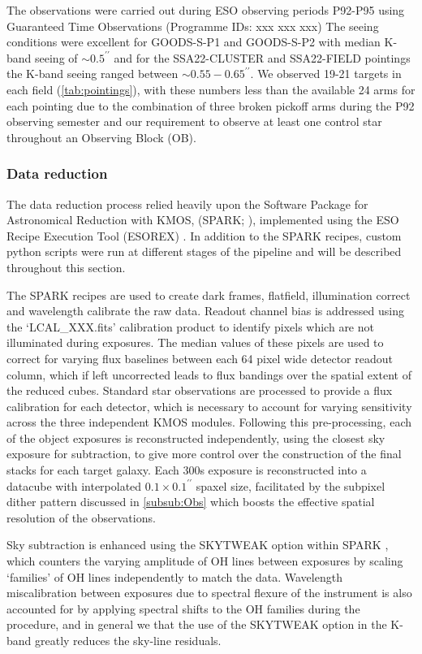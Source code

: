 \documentclass[fleqn,usenatbib]{mn2e}
\begin{document}
The observations were carried out during ESO observing periods P92-P95 using Guaranteed Time Observations (Programme IDs: xxx xxx xxx)
The seeing conditions were excellent for GOODS-S-P1 and GOODS-S-P2 with median K-band seeing of $\sim 0.5^{\prime\prime}$ and for the SSA22-CLUSTER and SSA22-FIELD pointings the K-band seeing ranged between $\sim 0.55-0.65^{\prime\prime}$.
We observed 19-21 targets in each field (\ref{tab:pointings}), with these numbers less than the available 24 arms for each pointing due to the combination of three broken pickoff arms during the P92 observing semester and our requirement to observe at least one control star throughout an Observing Block (OB).

\subsubsection{Data reduction}\label{subsubsec:datareduction}
The data reduction process relied heavily upon the Software Package for Astronomical Reduction with KMOS, (SPARK; \cite{Davies2013}), implemented using the ESO Recipe Execution Tool (ESOREX) \citep{Freudling2013}.
In addition to the SPARK recipes, custom python scripts were run at different stages of the pipeline and will be described throughout this section.

The SPARK recipes are used to create dark frames, flatfield, illumination correct and wavelength calibrate the raw data.
Readout channel bias is addressed using the `LCAL\_XXX.fits' calibration product to identify pixels which are not illuminated during exposures.
The median values of these pixels are used to correct for varying flux baselines between each 64 pixel wide detector readout column, which if left uncorrected leads to flux bandings over the spatial extent of the reduced cubes.
Standard star observations are processed to provide a flux calibration for each detector, which is necessary to account for varying sensitivity across the three independent KMOS modules. 
Following this pre-processing, each of the object exposures is reconstructed independently, using the closest sky exposure for subtraction, to give more control over the construction of the final stacks for each target galaxy.
Each 300s exposure is reconstructed into a datacube with interpolated $0.1\times0.1^{\prime\prime}$ spaxel size, facilitated by the subpixel dither pattern discussed in \cref{subsub:Obs} which boosts the effective spatial resolution of the observations.

Sky subtraction is enhanced using the SKYTWEAK option within SPARK \citep{Davies2007}, which counters the varying amplitude of OH lines between exposures by scaling `families' of OH lines independently to match the data.
Wavelength miscalibration between exposures due to spectral flexure of the instrument is also accounted for by applying spectral shifts to the OH families during the procedure, and in general we that the use of the SKYTWEAK option in the K-band greatly reduces the sky-line residuals. 
\end{document}
